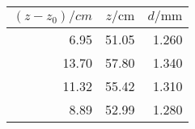 \begin{tabular}{rrr}
\toprule
$(z-z_0)/\si{cm}$ & $z/\si{\cm}$ & $d/\si{\mm}$ \\
\midrule
6.95 & 51.05 & 1.260 \\
13.70 & 57.80 & 1.340 \\
11.32 & 55.42 & 1.310 \\
8.89 & 52.99 & 1.280 \\
\bottomrule
\end{tabular}
